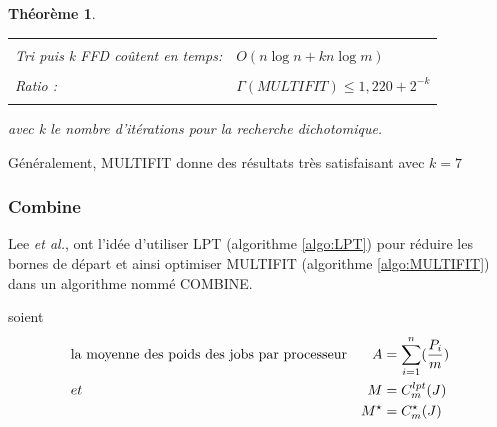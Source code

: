 \documentclass[a4paper,12pt]{report}
\theoremstyle{plain}				%
\newtheorem{theoreme}{Théorème}	%
\theoremstyle{definition}				%
\newcommand{\tdi}[1]{\todo[inline]{{#1}}{}}
\newcommand{\lp}[1]{\todo[author=LP,color=yellow,inline]{#1}}
\begin{document}
\begin{theoreme}
\begin{flushleft}
\begin{tabular}{|p{8cm}p{6cm}|}
\hline
& \\
Tri puis k FFD coûtent en temps: & $O(n \log n + kn \log m)$
\\	%
& \\
Ratio \cite{lee1988multiprocessor}:& $\Gamma(MULTIFIT) \leq 1,220 + 2^{-k}$
\\
& \\
\hline
\end{tabular}
\end{flushleft}
avec k le nombre d'itérations pour la recherche dichotomique.
\end{theoreme}

Généralement, MULTIFIT donne des résultats très satisfaisant avec $k = 7$


\subsubsection{Combine}

Lee \emph{et al.}, \cite{lee1988multiprocessor} ont l'idée
d'utiliser LPT (algorithme \ref{algo:LPT}) pour réduire les bornes de départ
et ainsi optimiser MULTIFIT (algorithme \ref{algo:MULTIFIT}) dans un
algorithme nommé COMBINE.

\bigskip
soient
\begin{align*}
&\textnormal{la moyenne des poids des jobs par processeur} &A &= \sum_{i=1}^{n}(\frac{P_i}{m})\\
&et &M &= C_m^{lpt}(J) \\
& &M^\star &= C_m^\star(J)
\end{align*}
\end{document}

